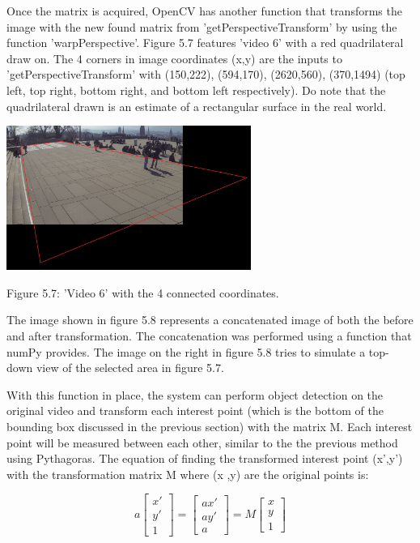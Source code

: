 \documentclass[12pt]{report}
\begin{document}
Once the matrix is acquired, OpenCV has another function that transforms the image with the new found matrix from 'getPerspectiveTransform' by using the function 'warpPerspective'. Figure 5.7 features 'video 6' with a red quadrilateral draw on. The 4 corners in image coordinates (x,y) are the inputs to 'getPerspectiveTransform' with (150,222), (594,170), (2620,560), (370,1494) (top left, top right, bottom right, and bottom left respectively). Do note that the quadrilateral drawn is an estimate of a rectangular surface in the real world.

\begin{center}
	\includegraphics[width=80mm]{./images/appendix/QuadSelected.JPG}
	
	{\footnotesize Figure 5.7: 'Video 6' with the 4 connected coordinates.}
\end{center}

The image shown in figure 5.8 represents a concatenated image of both the before and after transformation. The concatenation was performed using a function that numPy provides. The image on the right in figure 5.8 tries to simulate a top-down view of the selected area in figure 5.7. 

\vspace{2mm}

With this function in place, the system can perform object detection on the original video and transform each interest point (which is the bottom of the bounding box discussed in the previous section) with the matrix M. Each interest point will be measured between each other, similar to the the previous method using Pythagoras. The equation of finding the transformed interest point (x',y') with the transformation matrix M where (x ,y) are the original points is:

\begin{equation*}
a
\begin{bmatrix}
x' \\
y' \\
1
\end{bmatrix}
=
\begin{bmatrix}
ax' \\
ay' \\
a
\end{bmatrix}
= M
\begin{bmatrix}
x \\
y \\
1
\end{bmatrix}
\end{equation*}
\end{document}
